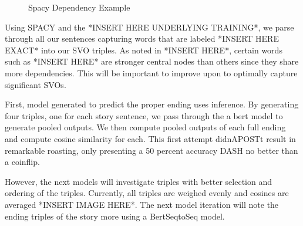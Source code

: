 \documentclass{article}
\begin{document}
\begin{multicols}{2}

\begin{figure}[H]
    \centering
    \caption{Spacy Dependency Example}
\end{figure}


Using SPACY and the *INSERT HERE UNDERLYING TRAINING*, we parse through all our sentences capturing words that are labeled *INSERT HERE EXACT* 
into our SVO triples. As noted in *INSERT HERE*, certain words such as *INSERT HERE* are stronger central nodes than others since they share more
dependencies.  This will be important to improve upon 
to optimally capture significant SVOs.

First, model generated to predict the proper ending uses inference. By generating four triples, one for each story sentence, we pass through the 
a bert model to generate pooled outputs. We then compute pooled outputs of each full ending and compute cosine similarity for each. This first 
attempt didnAPOSTt result in remarkable roasting, only presenting a 50 percent accuracy DASH no better than a coinflip.

However, the next models will investigate triples with better selection and ordering of the triples. Currently, all triples are weighed evenly 
and cosines are averaged *INSERT IMAGE HERE*. The next model iteration will note the ending triples of the story more using a BertSeqtoSeq model. 



\end{multicols}
\end{document}
